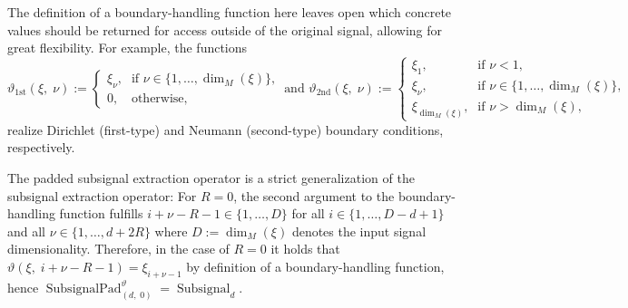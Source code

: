 \documentclass[journal]{IEEEtran}
\newcommand{\discint}[2]{\{#1,\dotsc,#2\}}
\newcommand{\inint}[2]{\in\discint{#1}{#2}}
\DeclareMathOperator{\Subsignal}{Subsignal}
\DeclareMathOperator{\SubsignalPad}{SubsignalPad}
\newcommand{\Dirichlet}{1\text{st}}
\newcommand{\Neumann}{2\text{nd}}
\begin{document}
The definition of a boundary-handling function here leaves open which concrete values should be returned for access outside of the original signal, allowing for great flexibility.
For example, the functions
\begin{displaymath}
  \vartheta_{\Dirichlet}(\xi,\;\nu) := \begin{cases}
    \xi_\nu\text{,} & \text{if }\nu\inint{1}{\dim_M(\xi)}\text{,}\\
    0\text{,} & \text{otherwise,}
  \end{cases}
  \text{ and }
  \vartheta_{\Neumann}(\xi,\;\nu) := \begin{cases}
    \xi_1\text{,} & \text{if }\nu < 1\text{,}\\
    \xi_\nu\text{,} & \text{if }\nu\inint{1}{\dim_M(\xi)}\text{,}\\
    \xi_{\dim_M(\xi)}\text{,} & \text{if }\nu > \dim_M(\xi)\text{,}
  \end{cases}
\end{displaymath}
realize Dirichlet (first-type) and Neumann (second-type) boundary conditions, respectively.

The padded subsignal extraction operator is a strict generalization of the subsignal extraction operator:
For $R = 0$, the second argument to the boundary-handling function fulfills $i + \nu - R - 1\inint{1}{D}$ for all $i\inint{1}{D - d + 1}$ and all $\nu\inint{1}{d + 2R}$ where $D := \dim_M(\xi)$ denotes the input signal dimensionality.
Therefore, in the case of $R = 0$ it holds that $\vartheta(\xi,\;i + \nu - R - 1) = \xi_{i + \nu - 1}$ by definition of a boundary-handling function, hence $\SubsignalPad_{(d,\; 0)}^{\vartheta} = \Subsignal_d$.
\end{document}

